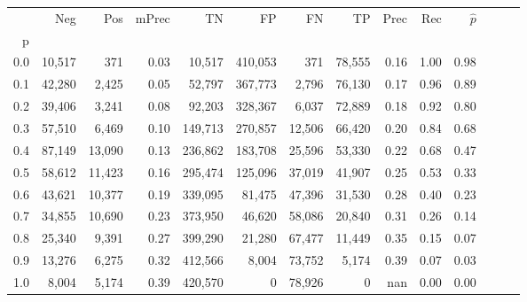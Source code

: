 \begin{tabular}{rrrrrrrrrrrrrr}
\toprule
{} &     Neg &     Pos & mPrec &       TN &       FP &      FN &      TP &  Prec &   Rec & $\hat{p}$ \\
p   &         &         &       &          &          &         &         &       &       &           \\
\midrule
0.0 &  10,517 &     371 &  0.03 &   10,517 &  410,053 &     371 &  78,555 &  0.16 &  1.00 &      0.98 \\
0.1 &  42,280 &   2,425 &  0.05 &   52,797 &  367,773 &   2,796 &  76,130 &  0.17 &  0.96 &      0.89 \\
0.2 &  39,406 &   3,241 &  0.08 &   92,203 &  328,367 &   6,037 &  72,889 &  0.18 &  0.92 &      0.80 \\
0.3 &  57,510 &   6,469 &  0.10 &  149,713 &  270,857 &  12,506 &  66,420 &  0.20 &  0.84 &      0.68 \\
0.4 &  87,149 &  13,090 &  0.13 &  236,862 &  183,708 &  25,596 &  53,330 &  0.22 &  0.68 &      0.47 \\
0.5 &  58,612 &  11,423 &  0.16 &  295,474 &  125,096 &  37,019 &  41,907 &  0.25 &  0.53 &      0.33 \\
0.6 &  43,621 &  10,377 &  0.19 &  339,095 &   81,475 &  47,396 &  31,530 &  0.28 &  0.40 &      0.23 \\
0.7 &  34,855 &  10,690 &  0.23 &  373,950 &   46,620 &  58,086 &  20,840 &  0.31 &  0.26 &      0.14 \\
0.8 &  25,340 &   9,391 &  0.27 &  399,290 &   21,280 &  67,477 &  11,449 &  0.35 &  0.15 &      0.07 \\
0.9 &  13,276 &   6,275 &  0.32 &  412,566 &    8,004 &  73,752 &   5,174 &  0.39 &  0.07 &      0.03 \\
1.0 &   8,004 &   5,174 &  0.39 &  420,570 &        0 &  78,926 &       0 &   nan &  0.00 &      0.00 \\
\bottomrule
\end{tabular}
